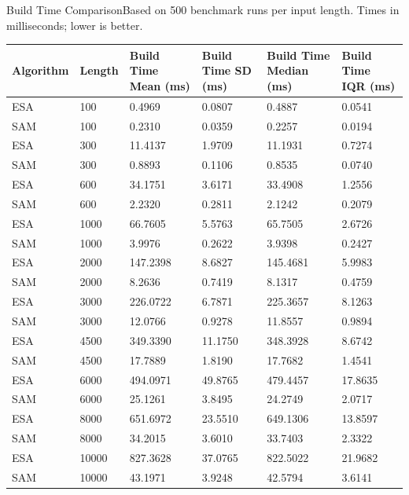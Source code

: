 \begin{benchmarktable}{Build Time Comparison}{Based on 500 benchmark runs per input length. Times in milliseconds; lower is better.}
\begin{tabularx}{\textwidth}{|X|X|X|X|X|X|}
\toprule
Algorithm & Length & Build Time Mean (ms) & Build Time SD (ms) & Build Time Median (ms) & Build Time IQR (ms) \\
\midrule
ESA & 100 & 0.4969 & 0.0807 & 0.4887 & 0.0541 \\
SAM & 100 & 0.2310 & 0.0359 & 0.2257 & 0.0194 \\
\hline
ESA & 300 & 11.4137 & 1.9709 & 11.1931 & 0.7274 \\
SAM & 300 & 0.8893 & 0.1106 & 0.8535 & 0.0740 \\
\hline
ESA & 600 & 34.1751 & 3.6171 & 33.4908 & 1.2556 \\
SAM & 600 & 2.2320 & 0.2811 & 2.1242 & 0.2079 \\
\hline
ESA & 1000 & 66.7605 & 5.5763 & 65.7505 & 2.6726 \\
SAM & 1000 & 3.9976 & 0.2622 & 3.9398 & 0.2427 \\
\hline
ESA & 2000 & 147.2398 & 8.6827 & 145.4681 & 5.9983 \\
SAM & 2000 & 8.2636 & 0.7419 & 8.1317 & 0.4759 \\
\hline
ESA & 3000 & 226.0722 & 6.7871 & 225.3657 & 8.1263 \\
SAM & 3000 & 12.0766 & 0.9278 & 11.8557 & 0.9894 \\
\hline
ESA & 4500 & 349.3390 & 11.1750 & 348.3928 & 8.6742 \\
SAM & 4500 & 17.7889 & 1.8190 & 17.7682 & 1.4541 \\
\hline
ESA & 6000 & 494.0971 & 49.8765 & 479.4457 & 17.8635 \\
SAM & 6000 & 25.1261 & 3.8495 & 24.2749 & 2.0717 \\
\hline
ESA & 8000 & 651.6972 & 23.5510 & 649.1306 & 13.8597 \\
SAM & 8000 & 34.2015 & 3.6010 & 33.7403 & 2.3322 \\
\hline
ESA & 10000 & 827.3628 & 37.0765 & 822.5022 & 21.9682 \\
SAM & 10000 & 43.1971 & 3.9248 & 42.5794 & 3.6141 \\
\bottomrule
\end{tabularx}
\end{benchmarktable}

